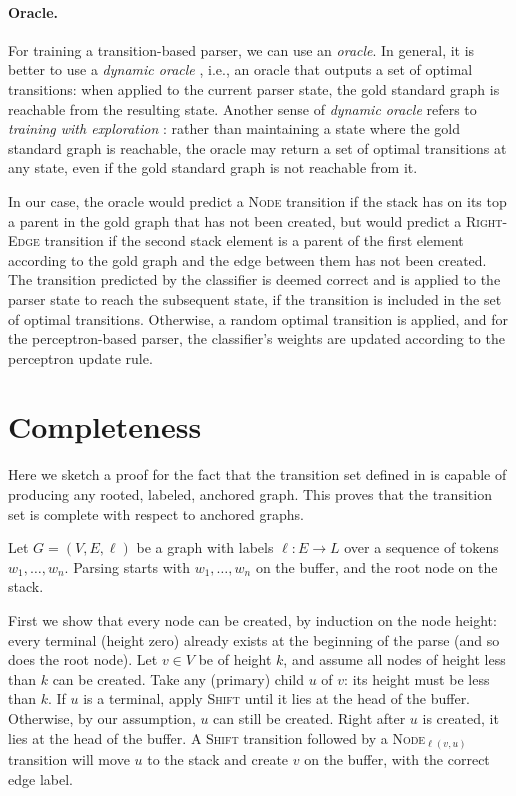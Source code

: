 \documentclass[11pt,a4paper]{article}
\begin{document}
\paragraph{Oracle.}
For training a transition-based parser, we can use an \textit{oracle}.
In general, it is better to use a \textit{dynamic oracle} \cite{goldberg2012dynamic},
i.e., an oracle that outputs a set of optimal transitions: when
applied to the current parser state, the gold
standard graph is reachable from the resulting state.
Another sense of \textit{dynamic oracle} refers to \textit{training with exploration}
\cite{goldberg2013dynamic,goldberg2013training,ballesteros-EtAl:2016:EMNLP2016}:
rather than maintaining a state where the gold standard graph is reachable,
the oracle may return a set of optimal transitions at any state,
even if the gold standard graph is not reachable from it.

In our case, the oracle would predict a \textsc{Node} transition if the stack 
has on its top a parent in the gold graph that has not been created,
but would predict a \textsc{Right-Edge} transition if the second stack
element is a parent of the
first element according to the gold graph and the edge between them has not been created.
The transition predicted by the classifier is deemed correct
and is applied to the parser state to reach the subsequent state,
if the transition is included in the set of optimal transitions.
Otherwise, a random optimal transition is applied,
and for the perceptron-based parser, the classifier's weights are updated according
to the perceptron update rule.


\section{Completeness}\label{sec:completeness}

Here we sketch a proof for the fact that the transition set defined in \cite{hershcovich2017a}
is capable of producing any rooted, labeled, anchored graph.
This proves that the transition set is complete with respect to anchored graphs.

Let $G=(V,E,\ell)$ be a graph with labels $\ell:E\rightarrow L$
over a sequence of tokens $w_1, \ldots, w_n$.
Parsing starts with $w_1, \ldots, w_n$ on the buffer,
and the root node on the stack.

First we show that every node can be created, by induction on the node height:
every terminal (height zero) already exists at the beginning of the parse
(and so does the root node).
Let $v\in V$ be of height $k$, and assume all nodes of height less than $k$ can be created.
Take any (primary) child $u$ of $v$: its height must be less than $k$.
If $u$ is a terminal, apply \textsc{Shift} until it lies at the head of the buffer.
Otherwise, by our assumption, $u$ can still be created.
Right after $u$ is created, it lies at the head of the buffer.
A \textsc{Shift} transition followed by a \textsc{Node}$_{\ell(v,u)}$ transition will
move $u$ to the stack and create $v$ on the buffer, with the correct edge label.
\end{document}
